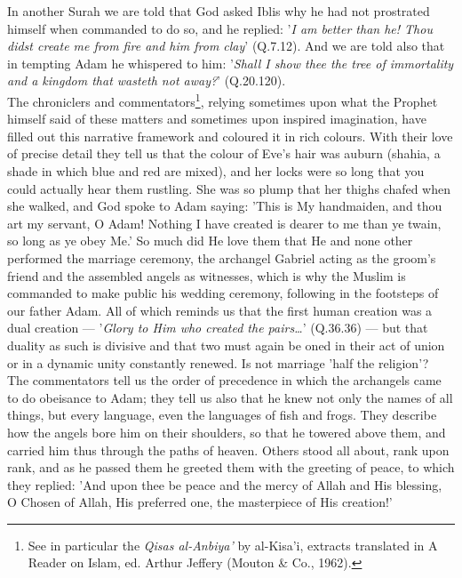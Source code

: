 \documentclass[11pt, b5paper, twoside]{book}
\begin{document}
In another Surah we are told that God asked Iblis why he had not prostrated himself when commanded to 
do so, and he replied: '\emph{I am better than he! Thou didst create me from fire and him from clay}' 
(Q.7.12). And we are told also that in tempting Adam he whispered to him: '\emph{Shall I show thee the tree 
of immortality and a kingdom that wasteth not away?}' (Q.20.120). \\

The chroniclers and commentators\footnote{See in particular the \emph{Qisas al-Anbiya'} by al-Kisa'i, extracts translated in A Reader on Islam, ed. Arthur Jeffery (Mouton \& Co., 1962).}, relying sometimes upon what the Prophet himself said of these 
matters and sometimes upon inspired imagination, have filled out this narrative framework and 
coloured it in rich colours. With their love of precise detail they tell us that the colour of Eve's 
hair was auburn (shahia, a shade in which blue and red are mixed), and her locks were so long that 
you could actually hear them rustling. She was so plump that her thighs chafed when she walked, and 
God spoke to Adam saying: 'This is My handmaiden, and thou art my servant, O Adam! Nothing I have 
created is dearer to me than ye twain, so long as ye obey Me.' So much did He love them that He and 
none other performed the marriage ceremony, the archangel Gabriel acting as the groom's friend and 
the assembled angels as witnesses, which is why the Muslim is commanded to make public his wedding 
ceremony, following in the footsteps of our father Adam. All of which reminds us that the first human 
creation was a dual creation --- '\emph{Glory to Him who created the pairs\ldots{}}' (Q.36.36) --- but that duality 
as such is divisive and that two must again be oned in their act of union or in a dynamic unity 
constantly renewed. Is not marriage 'half the religion'? \\

The commentators tell us the order of precedence in which the archangels came to do obeisance to 
Adam; they tell us also that he knew not only the names of all things, but every language, even the 
languages of fish and frogs. They describe how the angels bore him on their shoulders, so that he 
towered above them, and carried him thus through the paths of heaven. Others stood all about, rank 
upon rank, and as he passed them he greeted them with the greeting of peace, to which they replied: 
'And upon thee be peace and the mercy of Allah and His blessing, O Chosen of Allah, His preferred 
one, the masterpiece of His creation!' \\
\end{document}
